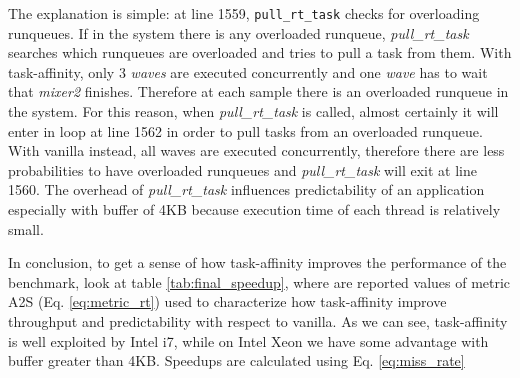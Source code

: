 \begin{description}
The explanation is simple: at line 1559, \texttt{pull\_rt\_task} checks for overloading runqueues. If in the system there 
is any overloaded runqueue, \textit{pull\_rt\_task} searches which runqueues are overloaded and tries to pull a task from them. With task-affinity, only 3 
\textit{waves} are executed concurrently and one \textit{wave} has to wait that \textit{mixer2} finishes. Therefore at each sample there is an overloaded 
runqueue in the system. For this reason, when \textit{pull\_rt\_task} is called, almost certainly it will enter in loop at line 1562 in order to pull tasks 
from an overloaded runqueue. With vanilla instead, all waves are executed concurrently, therefore there are less probabilities to have overloaded runqueues 
and \textit{pull\_rt\_task} will exit at line 1560. The overhead of \textit{pull\_rt\_task} influences predictability of an application especially with 
buffer of 4KB because execution time of each thread is relatively small.

\end{description}

In conclusion, to get a sense of how task-affinity improves the performance of the benchmark, look at table \ref{tab:final_speedup}, where are reported 
values of metric A2S (Eq. \ref{eq:metric_rt}) used to characterize how task-affinity improve throughput and predictability with respect to vanilla. As we 
can see, task-affinity is well exploited by Intel i7, while on Intel Xeon we have some advantage with buffer greater than 4KB. Speedups are calculated using
Eq. \ref{eq:miss_rate} 

\begin{table}[htbp]
\centering%
\hspace{4em}
\label{tab:final_speedup}
\caption{Comparison between task-affinity and vanilla on Intel Xeon and Intel i7}
\end{table}
